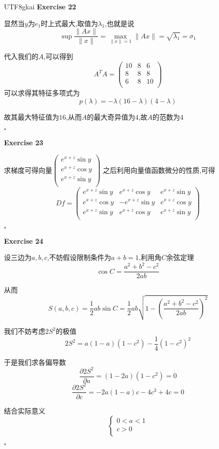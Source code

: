 \documentclass[11pt,hyperref,a4paper,UTF8]{ctexart}
\newenvironment{exercise}[1]{%
{\textbf{Exercise #1} \\ 
    }
}{
  \hfill $\square$ 
  \par\bigskip 
}
\newcommand{\parameter}[1]{\left(#1\right)}
\begin{document}
\begin{CJK}{UTF8}{gkai}
\begin{exercise}{22}
    显然当$y$为$e_1$时上式最大,取值为$\lambda_1$,也就是说
    \[\sup\frac{\|Ax\|}{\|x\|} = \max_{\|x\| = 1} \|Ax\| = \sqrt{\lambda_1} = \sigma_1\]

    代入我们的$A$,可以得到
    \[A^T A = \begin{pmatrix}
        10&8&6\\
        8&8&8\\
        6&8&10\\
    \end{pmatrix}\]
    可以求得其特征多项式为
    \[p(\lambda) = -\lambda(16 - \lambda)(4 - \lambda)\]

    故其最大特征值为$16$,从而$A$的最大奇异值为$4$,故$A$的范数为$4$
\end{exercise}

\begin{exercise}{23}
    求梯度可得向量$\begin{pmatrix}
        e^{x + z}\sin y\\
        e^{x + z}\cos y\\
        e^{x + z}\sin y\\
    \end{pmatrix}$
    之后利用向量值函数微分的性质,可得
    \[Df = \begin{pmatrix}
        e^{x + z}\sin y&e^{x + z}\cos y&e^{x + z}\sin y\\
        e^{x + z}\cos y&-e^{x + z}\sin y&e^{x + z}\cos y\\
        e^{x + z}\sin y&e^{x + z}\cos y&e^{x + z}\sin y\\
    \end{pmatrix}\]
\end{exercise}

\begin{exercise}{24}
    设三边为$a,b,c$,不妨假设限制条件为$a + b = 1$,利用角$C$余弦定理
    \[\cos C = \frac{a^2 + b^2 - c^2}{2ab}\]

    从而
    \[S(a,b,c) = \frac{1}{2}ab\sin C = \frac{1}{2}ab \sqrt{1 - \parameter{\frac{a^2 + b^2 - c^2}{2ab}}^2}\]

    我们不妨考虑$2S^2$的极值
    \[2S^2 = a(1 - a)(1 - c^2) - \frac{1}{4}(1 - c^2)^2\]

    于是我们求各偏导数
    \[\frac{\partial 2S^2}{\partial a} = (1 - 2a)(1 - c^2) = 0\]
    \[\frac{\partial 2S^2}{\partial c} = -2a(1 - a)c - 4c^3 + 4c = 0\]

    结合实际意义
    \[\begin{cases}
        0 < a < 1\\
        c > 0\\
    \end{cases}\]


\end{exercise}
\end{CJK}
\end{document}
